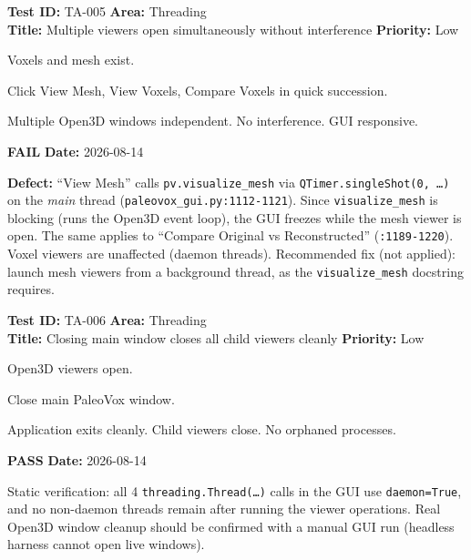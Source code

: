 \documentclass[12pt,a4paper]{article}
\newcommand{\pass}{\textcolor{paleogreen}{\textbf{PASS}}}
\newcommand{\fail}{\textcolor{paleored}{\textbf{FAIL}}}
\newcommand{\testheader}[4]{%
  \smallskip
  \noindent\textbf{Test ID:} #1 \hfill \textbf{Area:} #2 \\
  \textbf{Title:} #3 \hfill \textbf{Priority:} #4
}
\newenvironment{testbody}{%
  \begin{description}[leftmargin=2em,style=nextline]
}{%
  \end{description}
  \smallskip
}
\begin{document}
\testheader{TA-005}{Threading}{Multiple viewers open simultaneously without interference}{Low}
\begin{testbody}
  \item[\textbf{Preconditions:}] Voxels and mesh exist.
  \item[\textbf{Steps:}] Click View Mesh, View Voxels, Compare Voxels in quick
        succession.
  \item[\textbf{Expected Result:}] Multiple Open3D windows independent. No
        interference. GUI responsive.
  \item[\textbf{Status:}] \fail{} \hspace{1em} \textbf{Date:} 2026-08-14
  \item[\textbf{Notes:}] \textbf{Defect:} ``View Mesh'' calls
        \texttt{pv.visualize\_mesh} via
        \texttt{QTimer.singleShot(0, \ldots)} on the \emph{main} thread
        (\texttt{paleovox\_gui.py:1112-1121}). Since
        \texttt{visualize\_mesh} is blocking (runs the Open3D event loop), the
        GUI freezes while the mesh viewer is open. The same applies to
        ``Compare Original vs Reconstructed'' (\texttt{:1189-1220}). Voxel
        viewers are unaffected (daemon threads). Recommended fix (not applied):
        launch mesh viewers from a background thread, as the
        \texttt{visualize\_mesh} docstring requires.
\end{testbody}

\testheader{TA-006}{Threading}{Closing main window closes all child viewers cleanly}{Low}
\begin{testbody}
  \item[\textbf{Preconditions:}] Open3D viewers open.
  \item[\textbf{Steps:}] Close main PaleoVox window.
  \item[\textbf{Expected Result:}] Application exits cleanly. Child viewers
        close. No orphaned processes.
  \item[\textbf{Status:}] \pass{} \hspace{1em} \textbf{Date:} 2026-08-14
  \item[\textbf{Notes:}] Static verification: all 4
        \texttt{threading.Thread(\ldots)} calls in the GUI use
        \texttt{daemon=True}, and no non-daemon threads remain after running
        the viewer operations. Real Open3D window cleanup should be confirmed
        with a manual GUI run (headless harness cannot open live windows).
\end{testbody}
\end{document}
